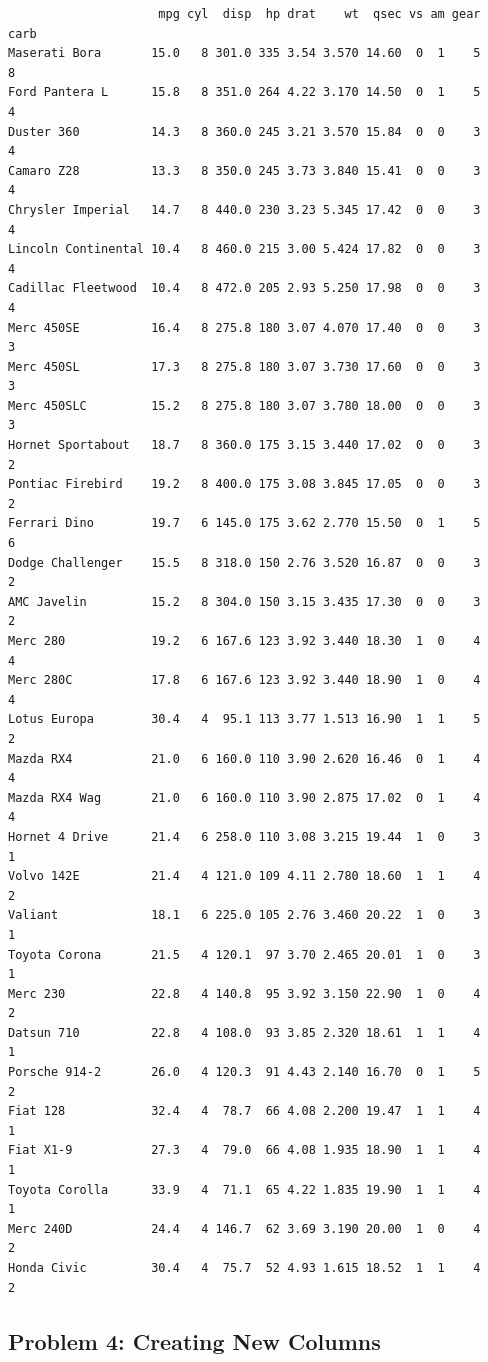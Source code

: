 \documentclass[
  letterpaper,
  DIV=11,
  numbers=noendperiod]{scrreprt}
\begin{document}
\begin{verbatim}
                     mpg cyl  disp  hp drat    wt  qsec vs am gear carb
Maserati Bora       15.0   8 301.0 335 3.54 3.570 14.60  0  1    5    8
Ford Pantera L      15.8   8 351.0 264 4.22 3.170 14.50  0  1    5    4
Duster 360          14.3   8 360.0 245 3.21 3.570 15.84  0  0    3    4
Camaro Z28          13.3   8 350.0 245 3.73 3.840 15.41  0  0    3    4
Chrysler Imperial   14.7   8 440.0 230 3.23 5.345 17.42  0  0    3    4
Lincoln Continental 10.4   8 460.0 215 3.00 5.424 17.82  0  0    3    4
Cadillac Fleetwood  10.4   8 472.0 205 2.93 5.250 17.98  0  0    3    4
Merc 450SE          16.4   8 275.8 180 3.07 4.070 17.40  0  0    3    3
Merc 450SL          17.3   8 275.8 180 3.07 3.730 17.60  0  0    3    3
Merc 450SLC         15.2   8 275.8 180 3.07 3.780 18.00  0  0    3    3
Hornet Sportabout   18.7   8 360.0 175 3.15 3.440 17.02  0  0    3    2
Pontiac Firebird    19.2   8 400.0 175 3.08 3.845 17.05  0  0    3    2
Ferrari Dino        19.7   6 145.0 175 3.62 2.770 15.50  0  1    5    6
Dodge Challenger    15.5   8 318.0 150 2.76 3.520 16.87  0  0    3    2
AMC Javelin         15.2   8 304.0 150 3.15 3.435 17.30  0  0    3    2
Merc 280            19.2   6 167.6 123 3.92 3.440 18.30  1  0    4    4
Merc 280C           17.8   6 167.6 123 3.92 3.440 18.90  1  0    4    4
Lotus Europa        30.4   4  95.1 113 3.77 1.513 16.90  1  1    5    2
Mazda RX4           21.0   6 160.0 110 3.90 2.620 16.46  0  1    4    4
Mazda RX4 Wag       21.0   6 160.0 110 3.90 2.875 17.02  0  1    4    4
Hornet 4 Drive      21.4   6 258.0 110 3.08 3.215 19.44  1  0    3    1
Volvo 142E          21.4   4 121.0 109 4.11 2.780 18.60  1  1    4    2
Valiant             18.1   6 225.0 105 2.76 3.460 20.22  1  0    3    1
Toyota Corona       21.5   4 120.1  97 3.70 2.465 20.01  1  0    3    1
Merc 230            22.8   4 140.8  95 3.92 3.150 22.90  1  0    4    2
Datsun 710          22.8   4 108.0  93 3.85 2.320 18.61  1  1    4    1
Porsche 914-2       26.0   4 120.3  91 4.43 2.140 16.70  0  1    5    2
Fiat 128            32.4   4  78.7  66 4.08 2.200 19.47  1  1    4    1
Fiat X1-9           27.3   4  79.0  66 4.08 1.935 18.90  1  1    4    1
Toyota Corolla      33.9   4  71.1  65 4.22 1.835 19.90  1  1    4    1
Merc 240D           24.4   4 146.7  62 3.69 3.190 20.00  1  0    4    2
Honda Civic         30.4   4  75.7  52 4.93 1.615 18.52  1  1    4    2
\end{verbatim}

\subsection*{Problem 4: Creating New
Columns}\label{problem-4-creating-new-columns}
\end{document}
